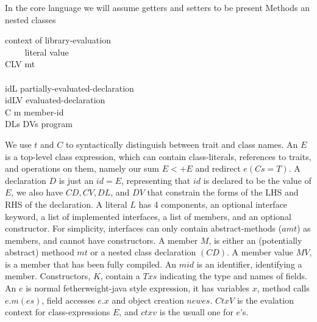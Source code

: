 In the core language we will assume getters and setters to be present
Methods an nested classes



\begin{bnf}
  {context of library-evaluation}\\     {\ \ \mmid{}\ \ }       {literal value}\\     {C\eq{}LV \mmid{} mt}                                                    {}\\           {}\\     {id\eq{}L}                                                         {partially-evaluated-declaration}\\     {id\eq{}LV}                                                       {evaluated-declaration}\\    {C \mmid{} m}                                                      {member-id}\\      {DLs\Q{;} DVs}                                                     {program}
\end{bnf}

We use $t$ and $C$ to syntactically distinguish between trait and class names.
An $E$ is a top-level class expression, which can contain class-literals, references to traits, and operations on them, namely our sum $E <+ E$ and redirect $e(Cs=T)$.
A declaration $D$ is just an $id = E$, representing that $id$ is declared to be the value of $E$, we also have $CD, CV, DL$, and $DV$ that constrain the forms of the LHS and RHS of the declaration.
A literal $L$ has 4 components, an optional interface keyword, a list of implemented interfaces, a list of members, and an optional constructor. For simplicity, interfaces can only contain abstract-methods ($amt$) as members, and cannot have  constructors. A member $M$, is either an (potentially abstract) methood $mt$ or a nested class declaration $(CD)$. A member value $MV$, is a member that has been fully compiled. An $mid$ is an identifier, identifying a member.
Constructors, $K$, contain a $Txs$ indicating the type and names of fields. An $e$ is normal fetherweight-java style expression, it has variables $x$, method calls $e.m(es)$, field accesses $e.x$ and object creation $new es$.
$CtxV$ is the evalation context for class-expressions $E$, and $ctxv$ is the usuall one for $e$’s.

